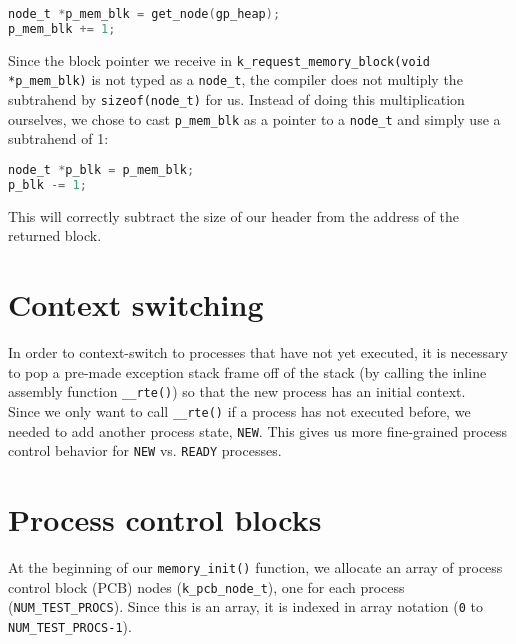 \documentclass[12pt]{report}
\begin{document}
\begin{minipage}{\textwidth}
\begin{lstlisting}[language=C]
node_t *p_mem_blk = get_node(gp_heap);
p_mem_blk += 1;
\end{lstlisting}
\end{minipage}

Since the block pointer we receive in \texttt{k_request_memory_block(void *p_mem_blk)} is not typed as a \texttt{node_t}, the compiler does not multiply the subtrahend by \texttt{sizeof(node_t)} for us. Instead of doing this multiplication ourselves, we chose to cast \texttt{p_mem_blk} as a pointer to a \texttt{node_t} and simply use a subtrahend of 1:

\begin{minipage}{\textwidth}
\begin{lstlisting}[language=C]
node_t *p_blk = p_mem_blk;
p_blk -= 1;
\end{lstlisting}
\end{minipage}

This will correctly subtract the size of our header from the address of the returned block.

\section{Context switching}

In order to context-switch to processes that have not yet executed, it is necessary to pop a pre-made exception stack frame off of the stack (by calling the inline assembly function \texttt{__rte()}) so that the new process has an initial context.\\

Since we only want to call \texttt{__rte()} if a process has not executed before, we needed to add another process state, \texttt{NEW}. This gives us more fine-grained process control behavior for \texttt{NEW} vs. \texttt{READY} processes.

\section{Process control blocks}

At the beginning of our \texttt{memory_init()} function, we allocate an array of process control block (PCB) nodes (\texttt{k_pcb_node_t}), one for each process (\texttt{NUM_TEST_PROCS}). Since this is an array, it is indexed in array notation (\texttt{0} to \texttt{NUM_TEST_PROCS-1}).\\
\end{document}
